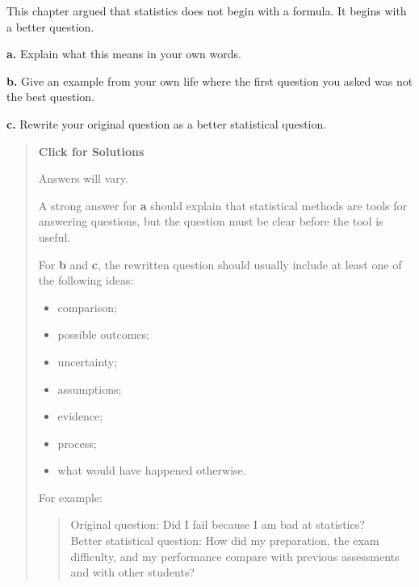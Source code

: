 \documentclass[
  letterpaper,
  DIV=11,
  numbers=noendperiod]{scrreprt}
\providecommand{\tightlist}{%
  \setlength{\itemsep}{0pt}\setlength{\parskip}{0pt}}
\begin{document}
\begin{tcolorbox}[enhanced jigsaw, arc=.35mm, bottomrule=.15mm, bottomtitle=1mm, breakable, colback=white, colbacktitle=quarto-callout-note-color!10!white, colframe=quarto-callout-note-color-frame, coltitle=black, left=2mm, leftrule=.75mm, opacityback=0, opacitybacktitle=0.6, rightrule=.15mm, title=\textcolor{quarto-callout-note-color}{\faInfo}\hspace{0.5em}{Question 18}, titlerule=0mm, toprule=.15mm, toptitle=1mm]

This chapter argued that statistics does not begin with a formula. It
begins with a better question.

\textbf{a.} Explain what this means in your own words.

\textbf{b.} Give an example from your own life where the first question
you asked was not the best question.

\textbf{c.} Rewrite your original question as a better statistical
question.

\begin{quote}
\textbf{Click for Solutions}

Answers will vary.

A strong answer for \textbf{a} should explain that statistical methods
are tools for answering questions, but the question must be clear before
the tool is useful.

For \textbf{b} and \textbf{c}, the rewritten question should usually
include at least one of the following ideas:

\begin{itemize}
\tightlist
\item
  comparison;
\item
  possible outcomes;
\item
  uncertainty;
\item
  assumptions;
\item
  evidence;
\item
  process;
\item
  what would have happened otherwise.
\end{itemize}

For example:

\begin{quote}
Original question: Did I fail because I am bad at statistics?\\
Better statistical question: How did my preparation, the exam
difficulty, and my performance compare with previous assessments and
with other students?
\end{quote}
\end{quote}

\end{tcolorbox}
\end{document}
